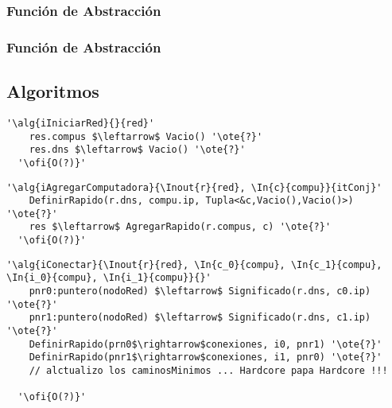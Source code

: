   \subsubsection{Función de Abstracción}

\subsubsection{Función de Abstracción}




\subsection{Algoritmos}
\lstset{style=alg}
\begin{lstlisting}[mathescape]
  '\alg{iIniciarRed}{}{red}'
    res.compus $\leftarrow$ Vacio() '\ote{?}'
    res.dns $\leftarrow$ Vacio() '\ote{?}'
  '\ofi{O(?)}'
\end{lstlisting}

\begin{lstlisting}[mathescape]
  '\alg{iAgregarComputadora}{\Inout{r}{red}, \In{c}{compu}}{itConj}'
    DefinirRapido(r.dns, compu.ip, Tupla<&c,Vacio(),Vacio()>) '\ote{?}'
    res $\leftarrow$ AgregarRapido(r.compus, c) '\ote{?}'
  '\ofi{O(?)}'
\end{lstlisting}

\begin{lstlisting}[mathescape]
  '\alg{iConectar}{\Inout{r}{red}, \In{c_0}{compu}, \In{c_1}{compu}, \In{i_0}{compu}, \In{i_1}{compu}}{}'
    pnr0:puntero(nodoRed) $\leftarrow$ Significado(r.dns, c0.ip) '\ote{?}'
    pnr1:puntero(nodoRed) $\leftarrow$ Significado(r.dns, c1.ip) '\ote{?}'
    DefinirRapido(prn0$\rightarrow$conexiones, i0, pnr1) '\ote{?}'
    DefinirRapido(pnr1$\rightarrow$conexiones, i1, pnr0) '\ote{?}'
    // alctualizo los caminosMinimos ... Hardcore papa Hardcore !!! 

  '\ofi{O(?)}'
\end{lstlisting}

